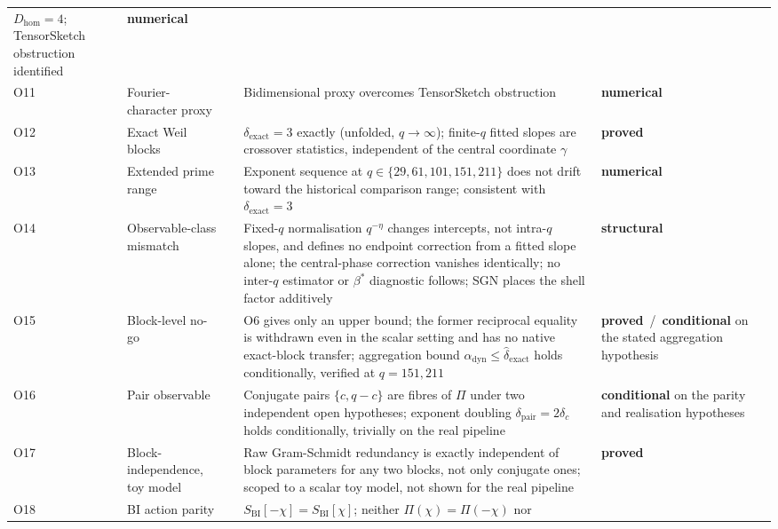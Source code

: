 \documentclass[11pt,a4paper]{article}
\newcommand{\sproved}{\textcolor{cproved}{\textbf{proved}}}
\newcommand{\sstruct}{\textcolor{cstruct}{\textbf{structural}}}
\newcommand{\snum}{\textcolor{cnum}{\textbf{numerical}}}
\newcommand{\scond}{\textcolor{ccond}{\textbf{conditional}}}
\begin{document}
\begin{longtable}{@{}p{1.70cm}p{2.9cm}p{1.3cm}p{6.25cm}>{\raggedright\arraybackslash}p{2.0cm}@{}}
      $D_{\mathrm{hom}} = 4$; TensorSketch obstruction identified &
      \snum \\[3pt]
      O11 & Fourier-character proxy & \cite{Beau2026a15} &
      Bidimensional proxy overcomes TensorSketch obstruction &
      \snum \\[3pt]
      O12 & Exact Weil blocks & \cite{Beau2026a16} &
      $\delta_{\mathrm{exact}}=3$ exactly (unfolded, $q\to\infty$); finite-$q$ fitted slopes are
      crossover statistics, independent of the central coordinate $\gamma$ &
      \sproved \\[3pt]
      O13 & Extended prime range & \cite{Beau2026a17} &
      Exponent sequence at $q\in\{29,61,101,151,211\}$ does not drift toward the
      historical comparison range; consistent with $\delta_{\mathrm{exact}}=3$ &
      \snum \\[3pt]
      O14 & Observable-class mismatch & \cite{Beau2026a18} &
      Fixed-$q$ normalisation $q^{-\eta}$ changes intercepts, not intra-$q$ slopes, and defines no endpoint
      correction from a fitted slope alone; the central-phase correction vanishes identically; no inter-$q$
      estimator or $\beta^*$ diagnostic follows; SGN places the shell factor additively &
      \sstruct \\[3pt]
      O15 & Block-level no-go & \cite{Beau2026a19} &
      O6 gives only an upper bound; the former reciprocal equality is withdrawn even in the scalar
      setting and has no native exact-block transfer; aggregation
      bound $\alpha_{\mathrm{dyn}}\leq\hat\delta_{\mathrm{exact}}$ holds conditionally, verified
      at $q=151,211$ &
      \sproved\ /\ \scond{} on the stated aggregation hypothesis \\[3pt]
      \midrule
      O16 & Pair observable & \cite{Beau2026a20} &
      Conjugate pairs $\{c,q-c\}$ are fibres of $\Pi$ under two independent open hypotheses;
      exponent doubling $\delta_{\mathrm{pair}}=2\delta_c$ holds conditionally, trivially on
      the real pipeline &
      \scond{} on the parity and realisation hypotheses \\[3pt]
      O17 & Block-independence, toy model & \cite{Beau2026a21} &
      Raw Gram-Schmidt redundancy is exactly independent of block parameters for any two
      blocks, not only conjugate ones; scoped to a scalar toy model, not shown for the real
      pipeline &
      \sproved \\[3pt]
      O18 & BI action parity & \cite{Beau2026a22} &
      $S_{\mathrm{BI}}[-\chi]=S_{\mathrm{BI}}[\chi]$; neither $\Pi(\chi)=\Pi(-\chi)$ nor

\end{longtable}
\end{document}
